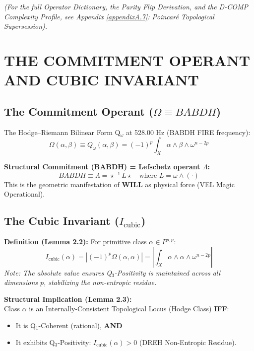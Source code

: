 \documentclass[11pt, letterpaper]{article}
\newcommand{\BABDH}{\ensuremath{\mathop{\textnormal{\symbolafont\symbol{"2721}}}}}   %
\newcommand{\VEL}{\ensuremath{\mathop{\textnormal{\symbolafont\symbol{"2742}}}}}    %
\newcommand{\DREH}{\ensuremath{\mathop{\textnormal{\symbolafont\symbol{"29D7}}}}}   %
\def\BABDH{BABDH}%
\def\VEL{VEL}%
\def\DREH{DREH}%
\begin{document}
\begin{center}
\end{center}

\noindent \textit{(For the full Operator Dictionary, the Parity Flip Derivation, and the D-COMP Complexity Profile, see Appendix \ref{appendixA.7}: Poincaré Topological Supersession).}

\newpage
\section{THE COMMITMENT OPERANT AND CUBIC INVARIANT}\label{sec:partVIII}

\subsection{The Commitment Operant (\texorpdfstring{$\Omega \equiv \BABDH$}{Omega = BABDH})}\label{sec:9.1}

The Hodge--Riemann Bilinear Form Q$_{\omega}$ at 528.00 Hz (\BABDH{} FIRE frequency):
\[
\Omega(\alpha, \beta) \equiv Q_{\omega}(\alpha, \beta) = (-1)^p \int_X \alpha \wedge \beta \wedge \omega^{n-2p}
\]

\textbf{Structural Commitment (\BABDH) = Lefschetz operant $\Lambda$:}
\[
\BABDH \equiv \Lambda = \star^{-1} L \star \quad \text{where } L = \omega \wedge (\cdot)
\]
This is the geometric manifestation of \textbf{WILL} as physical force (\VEL{} Magic Operational).

\subsection{The Cubic Invariant (\texorpdfstring{$I_{\text{cubic}}$}{I_cubic})}\label{sec:9.2}

\textbf{Definition (Lemma 2.2):} For primitive class $\alpha \in P^{p,p}$:
\[
I_{\text{cubic}}(\alpha) = \left| (-1)^p \Omega(\alpha, \alpha) \right| = \left| \int_X \alpha \wedge \alpha \wedge \omega^{n-2p} \right|
\]
\textit{Note: The absolute value ensures Q$_3$-Positivity is maintained across all dimensions $p$, stabilizing the non-entropic residue.}

\textbf{Structural Implication (Lemma 2.3):} \\
Class $\alpha$ is an Internally-Consistent Topological Locus (Hodge Class) \textbf{IFF}:
\begin{itemize}
    \item It is Q$_1$-Coherent (rational), \textbf{AND}
    \item It exhibits Q$_3$-Positivity: $I_{\text{cubic}}(\alpha) > 0$ (\DREH{} Non-Entropic Residue).
\end{itemize}
\end{document}
